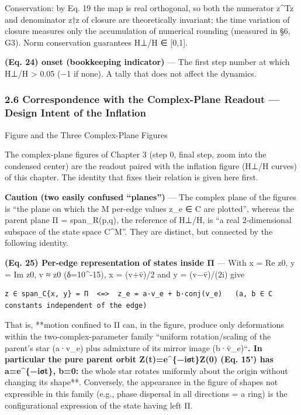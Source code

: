\documentclass[
  a4paper,
]{ltjsarticle}
\newcounter{none} %
\begin{document}
Conservation: by Eq. 19 the map is real orthogonal, so both the
numerator \textbar z\^{}Tz\textbar{} and denominator z†z of closure are
theoretically invariant; the time variation of closure measures only the
accumulation of numerical rounding (measured in §6, G3). Norm
conservation guarantees H⊥/H ∈ {[}0,1{]}.

\textbf{(Eq. 24) onset (bookkeeping indicator)} --- The first step
number at which H⊥/H \textgreater{} 0.05 (−1 if none). A tally that does
not affect the dynamics.

\subsubsection{2.6 Correspondence with the Complex-Plane Readout ---
Design Intent of the
Inflation}\label{correspondence-with-the-complex-plane-readout-design-intent-of-the-inflation}

Figure and the Three Complex-Plane Figures

The complex-plane figures of Chapter 3 (step 0, final step, zoom into
the condensed center) are the readout paired with the inflation figure
(H⊥/H curves) of this chapter. The identity that fixes their relation is
given here first.

\textbf{Caution (two easily confused ``planes'')} --- The complex plane
of the figures is ``the plane on which the M per-edge values z\_e ∈ C
are plotted'', whereas the parent plane Π = span\_R(p,q), the reference
of H⊥/H, is ``a real 2-dimensional subspace of the state space C\^{}M''.
They are distinct, but connected by the following identity.

\textbf{(Eq. 25) Per-edge representation of states inside Π} --- With x
= Re z0, y = Im z0, v ≈ z0 (δ=10\^{}-15), x = (v+v̄)/2 and y = (v−v̄)/(2i)
give

\begin{verbatim}
z ∈ span_C{x, y} = Π  <=>  z_e = a·v_e + b·conj(v_e)   (a, b ∈ C constants independent of the edge)
\end{verbatim}

That is, **motion confined to Π can, in the figure, produce only
deformations within the two-complex-parameter family ``uniform
rotation/scaling of the parent's star (a·v\_e) plus admixture of its
mirror image (b·v̄\_e)``\textbf{. In particular the pure parent orbit
Z(t)=e\^{}\{−iσt\}Z(0) (Eq. 15') has a=e\^{}\{−iσt\}, b=0: }the whole
star rotates uniformly about the origin without changing its shape**.
Conversely, the appearance in the figure of shapes not expressible in
this family (e.g., phase dispersal in all directions = a ring) is the
configurational expression of the state having left Π.
\end{document}
